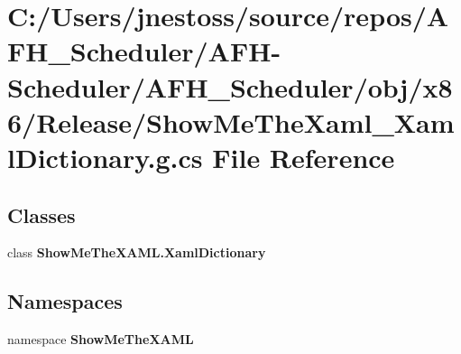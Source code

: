 \section{C\+:/\+Users/jnestoss/source/repos/\+A\+F\+H\+\_\+\+Scheduler/\+A\+F\+H-\/\+Scheduler/\+A\+F\+H\+\_\+\+Scheduler/obj/x86/\+Release/\+Show\+Me\+The\+Xaml\+\_\+\+Xaml\+Dictionary.g.\+cs File Reference}
\label{x86_2_release_2_show_me_the_xaml___xaml_dictionary_8g_8cs}
\subsection*{Classes}
\begin{DoxyCompactItemize}
\item 
class {\bfseries Show\+Me\+The\+X\+A\+M\+L.\+Xaml\+Dictionary}
\end{DoxyCompactItemize}
\subsection*{Namespaces}
\begin{DoxyCompactItemize}
\item 
namespace \textbf{ Show\+Me\+The\+X\+A\+ML}
\end{DoxyCompactItemize}
